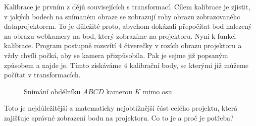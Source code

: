 \documentclass[twoside,12pt]{article}
\begin{document}
Kalibrace je prvním z dějů souvisejících s transformací. Cílem kalibrace je zjistit, v jakých bodech na snímaném obraze se zobrazují rohy obrazu zobrazovaného dataprojektorem. To je důležité proto, abychom dokázali přepočítat bod nalezený na obrazu webkamery na bod, který zobrazíme na projektoru. Nyní k funkci kalibrace. Program postupně rozsvítí 4 čtverečky v rozích obrazu projektoru a vždy chvíli počká, aby se kamera přizpůsobila. Pak je sejme již popsaným způsobem a najde je. Tímto získáváme 4 kalibrační body, se kterými již můžeme počítat v transformacích.

\begin{figure}[ht]
 \begin{center}
 \end{center}
 \caption{Snímání obdélníku $ABCD$ kamerou $K$ mimo osu}
\end{figure}
Toto je nejdůležitější a matematicky nejobtížnější část celého projektu, která zajišťuje správné zobrazení bodu na projektoru. Co to je a proč je potřeba?
\end{document}
